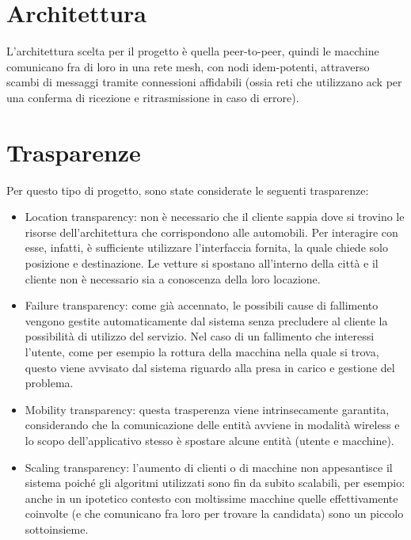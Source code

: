 \newpage

\section{Architettura}

L'architettura scelta per il progetto è quella peer-to-peer, quindi le macchine comunicano fra di loro in una rete mesh, con nodi idem-potenti, attraverso scambi di messaggi tramite connessioni affidabili (ossia reti che utilizzano ack per una conferma di ricezione e ritrasmissione in caso di errore).

\section{Trasparenze}\label{intro_trasparenze}

Per questo tipo di progetto, sono state considerate le seguenti trasparenze: 
\begin{itemize}
	\item Location transparency: non è necessario che il cliente sappia dove si trovino le risorse dell'architettura che corrispondono alle automobili. Per interagire con esse, infatti, è sufficiente utilizzare l'interfaccia fornita, la quale chiede solo posizione e destinazione. Le vetture si spostano all'interno della città e il cliente non è necessario sia a conoscenza della loro locazione.
	\item Failure transparency: come già accennato, le possibili cause di fallimento vengono gestite automaticamente dal sistema senza precludere al cliente la possibilità di utilizzo del servizio. Nel caso di un fallimento che interessi l'utente, come per esempio la rottura della macchina nella quale si trova, questo viene avvisato dal sistema riguardo alla presa in carico e gestione del problema.
	\item Mobility transparency: questa trasperenza viene intrinsecamente garantita, considerando che la comunicazione delle entità avviene in modalità wireless e lo scopo dell'applicativo stesso è spostare alcune entità (utente e macchine).
	\item Scaling transparency: l'aumento di clienti o di macchine non appesantisce il sistema poiché gli algoritmi utilizzati sono fin da subito scalabili, per esempio: anche in un ipotetico contesto con moltissime macchine quelle effettivamente coinvolte (e che comunicano fra loro per trovare la candidata) sono un piccolo sottoinsieme. 
\end{itemize}

